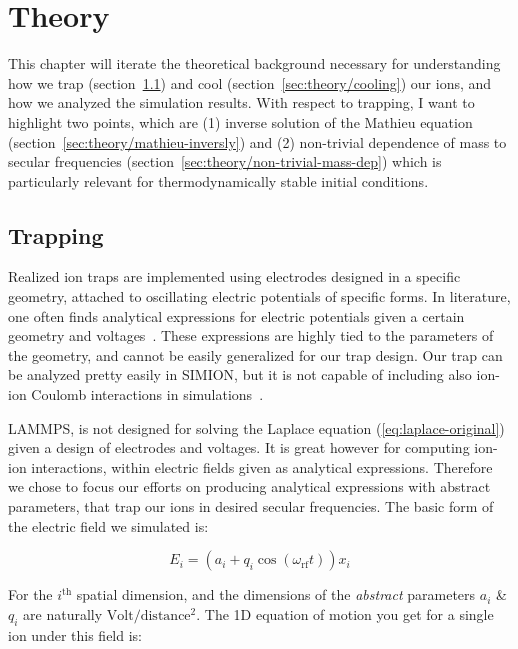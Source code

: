 \chapter{Theory}\label{chap:theory}

This chapter will iterate the theoretical background necessary for understanding how we trap (section~\ref{sec:theory/trapping}) and cool (section~\ref{sec:theory/cooling}) our ions, and how we analyzed the simulation results. With respect to trapping, I want to highlight two points, which are (1) inverse solution of the Mathieu equation (section~\ref{sec:theory/mathieu-inversly}) and (2) non-trivial dependence of mass to secular frequencies (section~\ref{sec:theory/non-trivial-mass-dep}) which is particularly relevant for thermodynamically stable initial conditions.

\section{Trapping}\label{sec:theory/trapping}

Realized ion traps are implemented using electrodes designed in a specific geometry, attached to oscillating electric potentials of specific forms. In literature, one often finds analytical expressions for electric potentials given a certain geometry and voltages~\cite{AkermanThesis}. These expressions are highly tied to the parameters of the geometry, and cannot be easily generalized for our trap design. Our trap can be analyzed pretty easily in SIMION\cite{SIMION}, but it is not capable of including also ion-ion Coulomb interactions in simulations~\cite{SimionHybridCoulombInteractions}.

LAMMPS\cite{LAMMPS}, is not designed for solving the Laplace equation (\ref{eq:laplace-original}) given a design of electrodes and voltages. It is great however for computing ion-ion interactions, within electric fields given as analytical expressions. Therefore we chose to focus our efforts on producing analytical expressions with abstract parameters, that trap our ions in desired secular frequencies. The basic form of the electric field we simulated is:

\begin{equation}
    E_i = (a_i + q_i \cos(\omega_\mathrm{rf} t)) x_i
    \label{eq:mathieu-source}
\end{equation}

For the $i^\mathrm{th}$ spatial dimension, and the dimensions of the \textit{abstract} parameters $a_i$ \& $q_i$ are naturally $\mathrm{Volt}/\mathrm{distance^2}$. The 1D equation of motion you get for a single ion under this field is:


